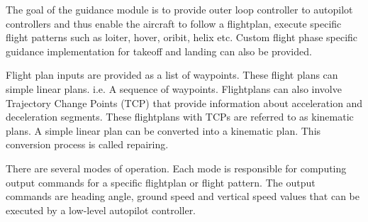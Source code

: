 The goal of the guidance module is to provide outer loop controller to autopilot controllers and thus enable the aircraft to follow a flightplan, execute specific flight patterns such as loiter, hover, oribit, helix etc. Custom flight phase specific guidance implementation for takeoff and landing can also be provided.

Flight plan inputs are provided as a list of waypoints. These flight plans can simple linear plans. i.\+e. A sequence of waypoints. Flightplans can also involve Trajectory Change Points (TCP) that provide information about acceleration and deceleration segments. These flightplans with TCPs are referred to as kinematic plans. A simple linear plan can be converted into a kinematic plan. This conversion process is called repairing.

There are several modes of operation. Each mode is responsible for computing output commands for a specific flightplan or flight pattern. The output commands are heading angle, ground speed and vertical speed values that can be executed by a low-\/level autopilot controller. 